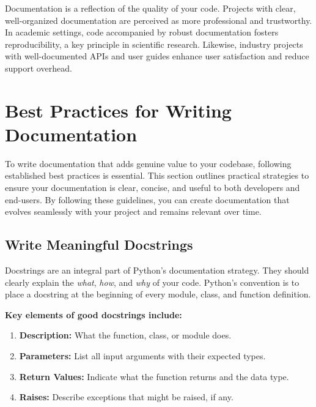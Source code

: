 \documentclass[
  letterpaper,
  DIV=11,
  numbers=noendperiod]{scrreprt}
\providecommand{\tightlist}{%
  \setlength{\itemsep}{0pt}\setlength{\parskip}{0pt}}\usepackage{longtable,booktabs,array}
\begin{document}
Documentation is a reflection of the quality of your code. Projects with
clear, well-organized documentation are perceived as more professional
and trustworthy. In academic settings, code accompanied by robust
documentation fosters reproducibility, a key principle in scientific
research. Likewise, industry projects with well-documented APIs and user
guides enhance user satisfaction and reduce support overhead.

\hypertarget{best-practices-for-writing-documentation}{%
\section{Best Practices for Writing
Documentation}\label{best-practices-for-writing-documentation}}

To write documentation that adds genuine value to your codebase,
following established best practices is essential. This section outlines
practical strategies to ensure your documentation is clear, concise, and
useful to both developers and end-users. By following these guidelines,
you can create documentation that evolves seamlessly with your project
and remains relevant over time.

\hypertarget{write-meaningful-docstrings}{%
\subsection{Write Meaningful
Docstrings}\label{write-meaningful-docstrings}}

Docstrings are an integral part of Python's documentation strategy. They
should clearly explain the \emph{what}, \emph{how}, and \emph{why} of
your code. Python's convention is to place a docstring at the beginning
of every module, class, and function definition.

\textbf{Key elements of good docstrings include:}

\begin{enumerate}
\def\labelenumi{\arabic{enumi}.}
\tightlist
\item
  \textbf{Description:} What the function, class, or module does.\\
\item
  \textbf{Parameters:} List all input arguments with their expected
  types.\\
\item
  \textbf{Return Values:} Indicate what the function returns and the
  data type.\\
\item
  \textbf{Raises:} Describe exceptions that might be raised, if any.
\end{enumerate}
\end{document}
